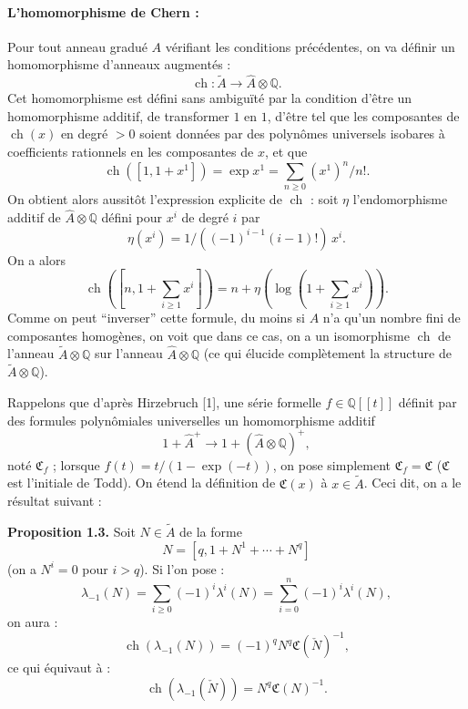 \documentclass[11pt]{article}
\newcommand{\ch}{\operatorname{ch}}
\providecommand{\Q}{\mathbb Q}
\providecommand{\Ahat}{\widehat A}
\providecommand{\Ahp}{\widehat A^{+}}
\providecommand{\ch}{\operatorname{ch}}
\begin{document}
\paragraph{L'homomorphisme de Chern :}
Pour tout anneau gradué $A$ vérifiant les conditions précédentes, on va définir un homomorphisme d'anneaux augmentés :
\begin{equation}\tag{1.26}
\ch:\widetilde A\longrightarrow \Ahat\otimes\Q.
\end{equation}
Cet homomorphisme est défini sans ambiguïté par la condition d'être un homomorphisme additif, de transformer $1$ en $1$, d'être tel que les composantes de $\ch(x)$ en degré $>0$ soient données par des polynômes universels isobares à coefficients rationnels en les composantes de $x$, et que
\begin{equation}\tag{1.27}
\ch([1,1+x^1])=\exp x^1=\sum_{n\geq0}(x^1)^n/n!.
\end{equation}
On obtient alors aussitôt l'expression explicite de $\ch$ : soit $\eta$ l'endomorphisme additif de $\Ahat\otimes\Q$ défini pour $x^i$ de degré $i$ par
\begin{equation}\tag{1.28}
\eta(x^i)=1/((-1)^{i-1}(i-1)!)\,x^i.
\end{equation}
On a alors
\begin{equation}\tag{1.29}
\ch\left([n,1+\sum_{i\geq1}x^i]\right)=n+\eta\left(\log\left(1+\sum_{i\geq1}x^i\right)\right).
\end{equation}
Comme on peut ``inverser'' cette formule, du moins si $A$ n'a qu'un nombre fini de composantes homogènes, on voit que dans ce cas, on a un isomorphisme $\ch$ de l'anneau $\widetilde A\otimes\Q$ sur l'anneau $\Ahat\otimes\Q$ (ce qui élucide complètement la structure de $\widetilde A\otimes\Q$).

Rappelons que d'après Hirzebruch [1], une série formelle $f\in\Q[[t]]$ définit par des formules polynômiales universelles un homomorphisme additif
\[
1+\Ahp\longrightarrow 1+(\Ahat\otimes\Q)^+,
\]
noté $\mathfrak C_f$ ; lorsque $f(t)=t/(1-\exp(-t))$, on pose simplement $\mathfrak C_f=\mathfrak C$ ($\mathfrak C$ est l'initiale de Todd). On étend la définition de $\mathfrak C(x)$ à $x\in\widetilde A$. Ceci dit, on a le résultat suivant :

\textbf{Proposition 1.3.} Soit $N\in\widetilde A$ de la forme
\[
N=[q,1+N^1+\cdots+N^q]
\]
(on a $N^i=0$ pour $i>q$). Si l'on pose :
\[
\lambda_{-1}(N)=\sum_{i\geq0}(-1)^i\lambda^i(N)=\sum_{i=0}^{n}(-1)^i\lambda^i(N),
\]
on aura :
\begin{equation}\tag{1.30}
\ch(\lambda_{-1}(N))=(-1)^q N^q\mathfrak C(\check N)^{-1},
\end{equation}
ce qui équivaut à :
\begin{equation}\tag{1.30 bis}
\ch(\lambda_{-1}(\check N))=N^q\mathfrak C(N)^{-1}.
\end{equation}
\end{document}
